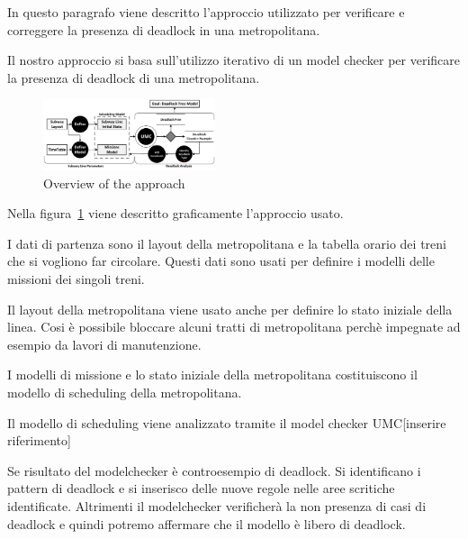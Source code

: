 


In questo paragrafo viene descritto l'approccio utilizzato per verificare e correggere la presenza di deadlock in una metropolitana.

Il nostro approccio si basa sull'utilizzo iterativo di un model checker per verificare la presenza di deadlock di una metropolitana.

\begin{figure}[htp]
	\begin{centering}	
	\includegraphics[width=0.45\textwidth, clip]{img/processo}
	\caption{Overview of the approach}
	\label{fig:process}
	\end{centering}
\end{figure}

Nella figura~\ref{fig:process} viene descritto graficamente l'approccio usato.

I dati di partenza sono  il layout della metropolitana e la tabella orario dei treni che si vogliono far circolare. Questi dati sono usati per definire
i modelli delle missioni dei singoli treni. 

Il layout della metropolitana viene usato anche per definire lo stato iniziale della linea. Cosi è possibile bloccare alcuni tratti di metropolitana perchè impegnate ad esempio da lavori di manutenzione.

I modelli di missione e lo stato iniziale della metropolitana costituiscono il modello di scheduling della metropolitana.


Il modello di scheduling viene analizzato tramite il model checker UMC[inserire riferimento]


Se risultato del modelchecker è controesempio di deadlock. Si identificano i pattern di deadlock e si inserisco delle nuove regole nelle aree scritiche identificate. 
Altrimenti il modelchecker verificherà la non presenza di casi di deadlock e quindi potremo affermare che il modello è libero di deadlock.
